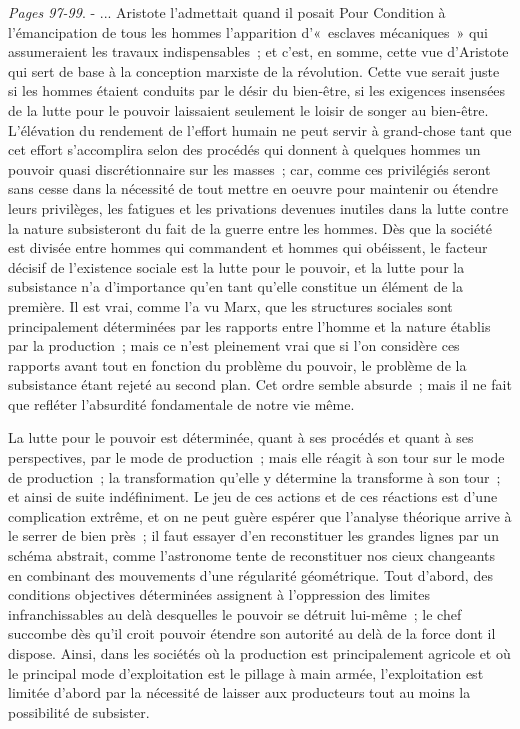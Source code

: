 \documentclass[french,twoside]{book} %
\begin{document}
{\itshape Pages 97-99}. - ... Aristote l'admettait quand il posait Pour Condition à l'émancipation de tous les hommes l'apparition d'« esclaves mécaniques » qui assumeraient les travaux indispensables ; et c'est, en somme, cette vue d'Aristote qui sert de base à la conception marxiste de la révolution. Cette vue serait juste si les hommes étaient conduits par le désir du bien-être, si les exigences insensées de la lutte pour le pouvoir laissaient seulement le loisir de songer au bien-être. L'élévation du rendement de l'effort humain ne peut servir à grand-chose tant que cet effort s'accomplira selon des procédés qui donnent à quelques hommes un pouvoir quasi discrétionnaire sur les masses ; car, comme ces privilégiés seront sans cesse dans la nécessité de tout mettre en oeuvre pour maintenir ou étendre leurs privilèges, les fatigues et les privations devenues inutiles dans la lutte contre la nature subsisteront du fait de la guerre entre les hommes. Dès que la société est divisée entre hommes qui commandent et hommes qui obéissent, le facteur décisif de l'existence sociale est la lutte pour le pouvoir, et la lutte pour la subsistance n'a d'importance qu'en tant qu'elle constitue un élément de la première. Il est vrai, comme l'a vu Marx, que les structures sociales sont principalement déterminées par les rapports entre l'homme et la nature établis par la production ; mais ce n'est pleinement vrai que si l’on considère ces rapports avant tout en fonction du problème du pouvoir, le problème de la subsistance étant rejeté au second plan. Cet ordre semble absurde ; mais il ne fait que refléter l'absurdité fondamentale de notre vie même.\par
La lutte pour le pouvoir est déterminée, quant à ses procédés et quant à ses perspectives, par le mode de production ; mais elle réagit à son tour sur le mode de production ; la transformation qu'elle y détermine la transforme à son tour ; et ainsi de suite indéfiniment. Le jeu de ces actions et de ces réactions est d'une complication extrême, et on ne peut guère espérer que l'analyse théorique arrive à le serrer de bien près ; il faut essayer d'en reconstituer les grandes lignes par un schéma abstrait, comme l'astronome tente de reconstituer nos cieux changeants en combinant des mouvements d'une régularité géométrique. Tout d'abord, des conditions objectives déterminées assignent à l'oppression des limites infranchissables au delà desquelles le pouvoir se détruit lui-même ; le chef succombe dès qu'il croit pouvoir étendre son autorité au delà de la force dont il dispose. Ainsi, dans les sociétés où la production est principalement agricole et où le principal mode d'exploitation est le pillage à main armée, l'exploitation est limitée d'abord par la nécessité de laisser aux producteurs tout au moins la possibilité de subsister.
\end{document}

